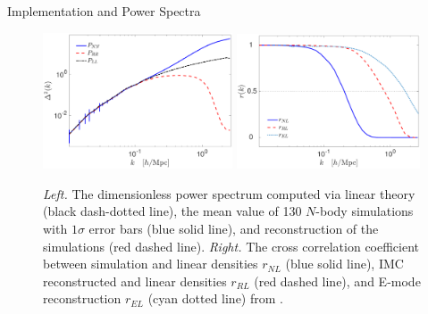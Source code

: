 \begin{section}{Implementation and Power Spectra}
  \begin{figure}
    \centering
    \includegraphics[width=0.5\textwidth]{fig2a.pdf}
    \includegraphics[width=0.485\textwidth]{fig2b.pdf}
    \caption{{\it Left.} The dimensionless power spectrum computed via
      linear theory (black dash-dotted line), the mean value of 130 $N$-body
      simulations with $1\sigma$ error bars (blue solid line), and reconstruction
      of the simulations (red dashed line).  {\it Right.} The cross correlation
      coefficient between simulation and linear densities $r_{NL}$ (blue solid line),
      IMC reconstructed and linear densities $r_{RL}$ (red dashed line), and E-mode reconstruction $r_{EL}$ (cyan dotted line) from \citealt{bib:Yu2016}.}
    \label{fig:cp}
  \end{figure}


\end{section}

